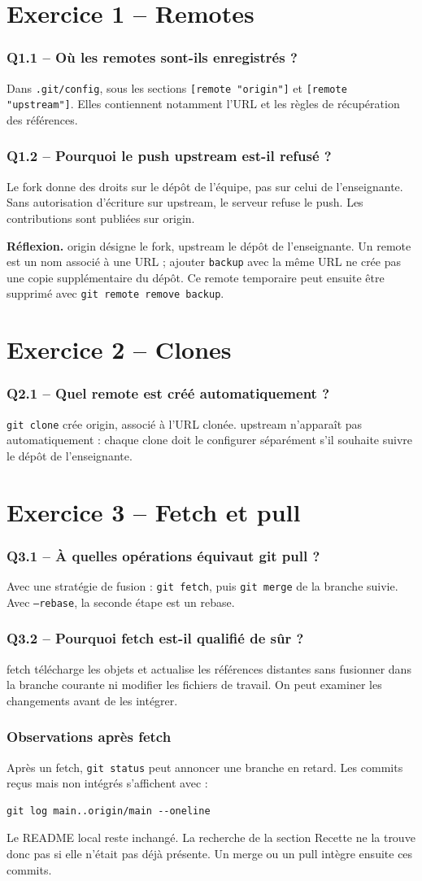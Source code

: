 \documentclass[10pt,a4paper]{article}
\newcommand{\question}[1]{\subsubsection*{#1}}
\begin{document}
\section*{Exercice 1 -- Remotes}
\question{Q1.1 -- Où les remotes sont-ils enregistrés ?}
Dans \texttt{.git/config}, sous les sections \texttt{[remote "origin"]} et \texttt{[remote "upstream"]}. Elles contiennent notamment l'URL et les règles de récupération des références.

\question{Q1.2 -- Pourquoi le push upstream est-il refusé ?}
Le fork donne des droits sur le dépôt de l'équipe, pas sur celui de l'enseignante. Sans autorisation d'écriture sur upstream, le serveur refuse le push. Les contributions sont publiées sur origin.

\textbf{Réflexion.} origin désigne le fork, upstream le dépôt de l'enseignante. Un remote est un nom associé à une URL ; ajouter \texttt{backup} avec la même URL ne crée pas une copie supplémentaire du dépôt. Ce remote temporaire peut ensuite être supprimé avec \texttt{git remote remove backup}.

\section*{Exercice 2 -- Clones}
\question{Q2.1 -- Quel remote est créé automatiquement ?}
\texttt{git clone} crée origin, associé à l'URL clonée. upstream n'apparaît pas automatiquement : chaque clone doit le configurer séparément s'il souhaite suivre le dépôt de l'enseignante.

\section*{Exercice 3 -- Fetch et pull}
\question{Q3.1 -- À quelles opérations équivaut git pull ?}
Avec une stratégie de fusion : \texttt{git fetch}, puis \texttt{git merge} de la branche suivie. Avec \texttt{--rebase}, la seconde étape est un rebase.

\question{Q3.2 -- Pourquoi fetch est-il qualifié de sûr ?}
fetch télécharge les objets et actualise les références distantes sans fusionner dans la branche courante ni modifier les fichiers de travail. On peut examiner les changements avant de les intégrer.

\subsubsection*{Observations après fetch}
Après un fetch, \texttt{git status} peut annoncer une branche en retard. Les commits reçus mais non intégrés s'affichent avec :
\begin{tcolorbox}[colback=Light,colframe=Border,boxrule=.4pt,arc=0pt,left=3mm,right=3mm,top=2mm,bottom=2mm]
\begin{Verbatim}[fontsize=\small]
git log main..origin/main --oneline
\end{Verbatim}
\end{tcolorbox}
Le README local reste inchangé. La recherche de la section Recette ne la trouve donc pas si elle n'était pas déjà présente. Un merge ou un pull intègre ensuite ces commits.
\end{document}
